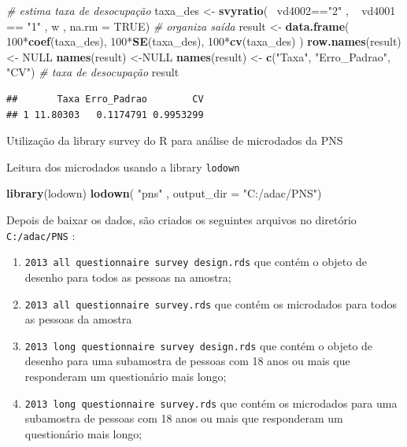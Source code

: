 \documentclass[]{book}
\newenvironment{Shaded}{\begin{snugshade}}{\end{snugshade}}
\newcommand{\KeywordTok}[1]{\textcolor[rgb]{0.13,0.29,0.53}{\textbf{{#1}}}}
\newcommand{\DataTypeTok}[1]{\textcolor[rgb]{0.13,0.29,0.53}{{#1}}}
\newcommand{\DecValTok}[1]{\textcolor[rgb]{0.00,0.00,0.81}{{#1}}}
\newcommand{\StringTok}[1]{\textcolor[rgb]{0.31,0.60,0.02}{{#1}}}
\newcommand{\CommentTok}[1]{\textcolor[rgb]{0.56,0.35,0.01}{\textit{{#1}}}}
\newcommand{\OtherTok}[1]{\textcolor[rgb]{0.56,0.35,0.01}{{#1}}}
\newcommand{\NormalTok}[1]{{#1}}
\numberwithin{example}{chapter}
\numberwithin{remark}{chapter}
\numberwithin{definition}{chapter}
\let\BeginKnitrBlock\begin \let\EndKnitrBlock\end
\begin{document}
\begin{Shaded}
\begin{Highlighting}[]
\CommentTok{# estima taxa de desocupação}
\NormalTok{taxa_des <-}\StringTok{ }\KeywordTok{svyratio}\NormalTok{(~}\StringTok{ }\NormalTok{vd4002==}\StringTok{"2"} \NormalTok{,}
  \NormalTok{~}\StringTok{ }\NormalTok{vd4001 ==}\StringTok{ "1"} \NormalTok{, w , }\DataTypeTok{na.rm =} \OtherTok{TRUE}\NormalTok{)}
\CommentTok{# organiza saída}
\NormalTok{result <-}\StringTok{ }\KeywordTok{data.frame}\NormalTok{(}
  \DecValTok{100}\NormalTok{*}\KeywordTok{coef}\NormalTok{(taxa_des),}
  \DecValTok{100}\NormalTok{*}\KeywordTok{SE}\NormalTok{(taxa_des), }
  \DecValTok{100}\NormalTok{*}\KeywordTok{cv}\NormalTok{(taxa_des)}
\NormalTok{)}
\KeywordTok{row.names}\NormalTok{(result)<-}\StringTok{ }\OtherTok{NULL}
\KeywordTok{names}\NormalTok{(result) <-}\OtherTok{NULL}
\KeywordTok{names}\NormalTok{(result) <-}\StringTok{ }\KeywordTok{c}\NormalTok{(}\StringTok{"Taxa"}\NormalTok{, }\StringTok{"Erro_Padrao"}\NormalTok{, }\StringTok{"CV"}\NormalTok{)}
\CommentTok{# taxa de desocupação}
\NormalTok{result}
\end{Highlighting}
\end{Shaded}

\begin{verbatim}
##       Taxa Erro_Padrao        CV
## 1 11.80303   0.1174791 0.9953299
\end{verbatim}

\BeginKnitrBlock{example}
\protect\hypertarget{ex:unnamed-chunk-27}{}{\label{ex:unnamed-chunk-27}}Utilização
da library survey do R para análise de microdados da PNS
\EndKnitrBlock{example} Leitura dos microdados usando a library
\texttt{lodown}\citep{R-lodown}

\begin{Shaded}
\begin{Highlighting}[]
\KeywordTok{library}\NormalTok{(lodown)}
\KeywordTok{lodown}\NormalTok{( }\StringTok{"pns"} \NormalTok{, }\DataTypeTok{output_dir =} \StringTok{"C:/adac/PNS"}\NormalTok{)}
\end{Highlighting}
\end{Shaded}

Depois de baixar os dados, são criados os seguintes arquivos no
diretório \texttt{C:/adac/PNS} :

\begin{enumerate}
\def\labelenumi{\arabic{enumi}.}
\item
  \texttt{2013\ all\ questionnaire\ survey\ design.rds} que contém o
  objeto de desenho para todos as pessoas na amostra;
\item
  \texttt{2013\ all\ questionnaire\ survey.rds} que contém os microdados
  para todos as pessoas da amostra
\item
  \texttt{2013\ long\ questionnaire\ survey\ design.rds} que contém o
  objeto de desenho para uma subamostra de pessoas com 18 anos ou mais
  que responderam um questionário mais longo;
\item
  \texttt{2013\ long\ questionnaire\ survey.rds} que contém os
  microdados para uma subamostra de pessoas com 18 anos ou mais que
  responderam um questionário mais longo;
\end{enumerate}
\end{document}
